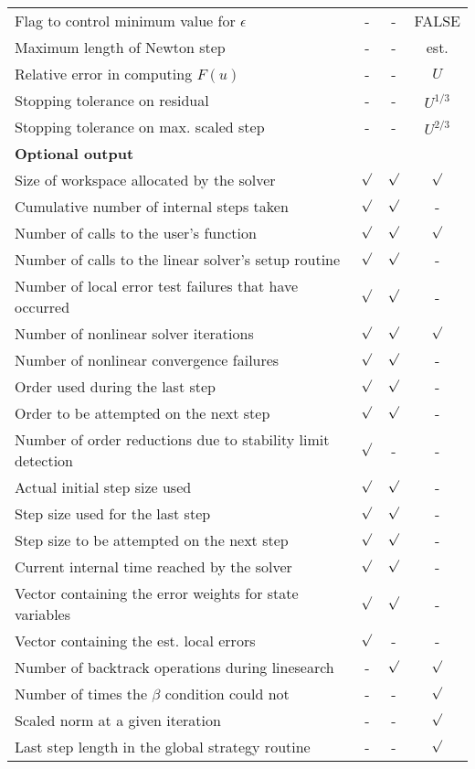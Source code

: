 \begin{table}[tp]
\begin{tabular}{|p{2.75in}|c|c|c|}
Flag to control minimum value for $\epsilon$ & - & - & FALSE \\
Maximum length of Newton step & - & - & est. \\
Relative error in computing $F(u)$ & - & - & $U$ \\
Stopping tolerance on residual & - & - & $U^{1/3}$ \\
Stopping tolerance on max. scaled step & - & - & $U^{2/3}$ \\
\hline
\hline
{\bf Optional output} &  &  & \\
\hline
Size of workspace allocated by the solver & $\surd$ & $\surd$ & $\surd$ \\
Cumulative number of internal steps taken & $\surd$ & $\surd$ & - \\
Number of calls to the user's function & $\surd$ & $\surd$ & $\surd$ \\
Number of calls to the linear solver's setup routine & $\surd$ & $\surd$ & - \\
Number of local error test failures that have occurred & $\surd$ & $\surd$ & - \\
Number of nonlinear solver iterations & $\surd$ & $\surd$ & $\surd$ \\
Number of nonlinear convergence failures & $\surd$ & $\surd$ & - \\
Order used during the last step & $\surd$ & $\surd$ & - \\
Order to be attempted on the next step & $\surd$ & $\surd$ & - \\
Number of order reductions due to stability limit detection & $\surd$ & - & - \\
Actual initial step size used & $\surd$ & $\surd$ & - \\
Step size used for the last step & $\surd$ & $\surd$ & - \\
Step size to be attempted on the next step & $\surd$ & $\surd$ & - \\
Current internal time reached by the solver & $\surd$ & $\surd$ & - \\
Vector containing the error weights for state variables & $\surd$ & $\surd$ & - \\
Vector containing the est. local errors & $\surd$ & - & - \\
Number of backtrack operations during linesearch & - & $\surd$ & $\surd$ \\
Number of times the $\beta$ condition could not & - & - & $\surd$ \\
Scaled norm at a given iteration & - & - & $\surd$ \\
Last step length in the global strategy routine & - & - & $\surd$ \\
\hline
\end{tabular}
\end{table}

